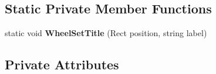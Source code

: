 \subsection*{Static Private Member Functions}
\begin{DoxyCompactItemize}
\item 
\mbox{\label{class_unity_editor_1_1_post_processing_1_1_color_grading_model_editor_ac66ca2e0870cc15eb92e4971cd02c931}} 
static void {\bfseries Wheel\+Set\+Title} (Rect position, string label)
\end{DoxyCompactItemize}
\subsection*{Private Attributes}
